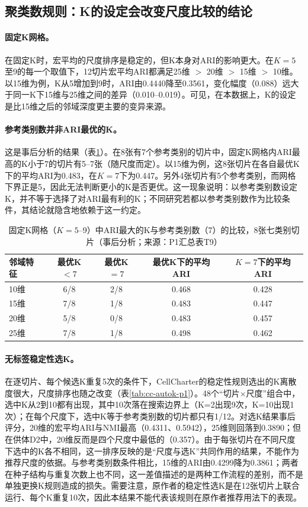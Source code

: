 \subsection{聚类数规则：K的设定会改变尺度比较的结论}
\label{subsec:cc-res-k-p1}

\paragraph{固定K网格。}在固定K时，宏平均的尺度排序是稳定的，但K本身对ARI的影响更大。在$K=5$至9的每一个取值下，12切片宏平均ARI都满足25维 $>$ 20维 $>$ 15维 $>$ 10维。以15维为例，K从5增加到9时，ARI由0.4440降至0.3561，变化幅度（0.088）远大于同一K下15维与25维之间的差异（0.010--0.019）。可见，在本数据上，K的设定是比15维之后的邻域深度更主要的变异来源。

\paragraph{参考类别数并非ARI最优的K。}这是事后分析的结果（表\ref{tab:cc-kpref-p1}）。在8张有7个参考类别的切片中，固定K网格内ARI最高的K小于7的切片有5--7张（随尺度而定）。以15维为例，这8张切片在各自最优K下的平均ARI为0.483，在$K=7$下为0.447。另外4张切片有5个参考类别，而网格下界正是5，因此无法判断更小的K是否更优。这一现象说明：以参考类别数设定K，并不等于选择了对ARI最有利的K；不同研究若都以参考类别数作为比较条件，其结论就隐含地依赖于这一约定。

\begin{table}[htbp]
\centering
\caption{固定K网格（$K=5$--9）中ARI最大的K与参考类别数（7）的比较，8张七类别切片（事后分析；来源：P1汇总表T9）}
\label{tab:cc-kpref-p1}
\small
\begin{tabular}{lcccc}
\toprule
邻域特征 & 最优K$<7$ & 最优K$=7$ & 最优K下的平均ARI & $K=7$下的平均ARI\\
\midrule
10维 & 6/8 & 2/8 & 0.468 & 0.428\\
15维 & 7/8 & 1/8 & 0.483 & 0.447\\
20维 & 5/8 & 0/8 & 0.483 & 0.457\\
25维 & 7/8 & 1/8 & 0.498 & 0.462\\
\bottomrule
\end{tabular}
\end{table}

\paragraph{无标签稳定性选K。}在逐切片、每个候选K重复5次的条件下，CellCharter的稳定性规则选出的K离散度很大，尺度排序也随之改变（表\ref{tab:cc-autok-p1}）。48个“切片×尺度”组合中，选中K从2到10都有出现，其中10次落在搜索边界上（K=2出现9次，K=10出现1次）；在每个尺度下，选中K等于参考类别数的切片都只有1/12。对选K结果事后评分，20维的宏平均ARI与NMI最高（0.4311、0.5942），25维则回落到0.3890；但在供体D2中，20维反而是四个尺度中最低的（0.357）。由于每张切片在不同尺度下选中的K各不相同，这一排序反映的是“尺度与选K”共同作用的结果，不能作为推荐尺度的依据。与参考类别数条件相比，15维的ARI由0.4299降为0.3861；两者在种子结构与重复次数上也不同，这一差值描述的是两种工作流程的差别，而不是单独更换K规则造成的损失。需要注意，原作者的稳定性选K是在12张切片上联合运行、每个K重复10次\cite{varrone2024}，因此本结果不能代表该规则在原作者推荐用法下的表现。

